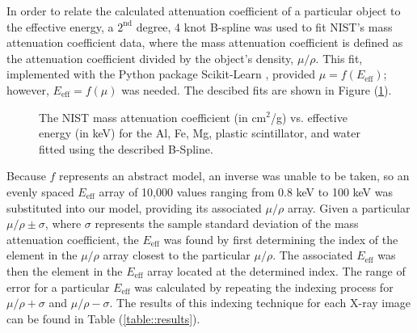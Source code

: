 In order to relate the calculated attenuation coefficient of a particular object to the effective energy, a $2^\text{nd}$ degree, 4 knot B-spline was used to fit NIST's mass attenuation coefficient data, where the mass attenuation coefficient is defined as the attenuation coefficient divided by the object's density, $\mu/\rho$. This fit, implemented with the Python package Scikit-Learn \cite{SKLearn}, provided $\mu = f(E_{\text{eff}})$; however, $E_{\text{eff}} = f(\mu)$ was needed. The descibed fits are shown in Figure (\ref{figure:NISTSplineFit}).


\begin{figure}[htbp]
    \centering
\end{figure}

\begin{figure}[htbp]
    \addtocounter{subfigure}{2}
    \ContinuedFloat
    \addtocounter{figure}{1}
    \centering
    \caption{The NIST mass attenuation coefficient (in cm$^2$/g) vs. effective energy (in keV) for the Al, Fe, Mg, plastic scintillator, and water fitted using the described B-Spline.}
    \label{figure:NISTSplineFit}
\end{figure}

\newpage
Because $f$ represents an abstract model, an inverse was unable to be taken, so an evenly spaced $E_{\text{eff}}$ array of 10,000 values ranging from 0.8 keV to 100 keV was substituted into our model, providing its associated $\mu/\rho$ array. Given a particular $\mu/\rho \pm \sigma$, where $\sigma$ represents the sample standard deviation of the mass attenuation coefficient, the $E_{\text{eff}}$ was found by first determining the index of the element in the $\mu/\rho$ array closest to the particular $\mu/\rho$. The associated $E_{\text{eff}}$ was then the element in the $E_{\text{eff}}$ array located at the determined index. The range of error for a particular $E_{\text{eff}}$ was calculated by repeating the indexing process for $\mu/\rho + \sigma$ and $\mu/\rho - \sigma$. The results of this indexing technique for each X-ray image can be found in Table (\ref{table::results}).

